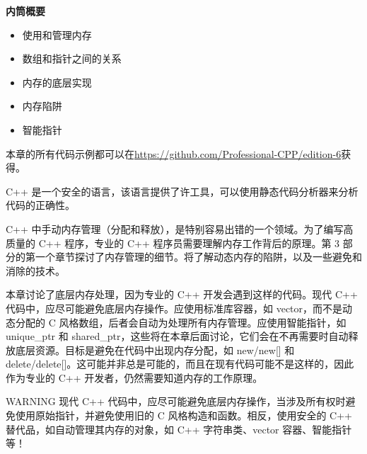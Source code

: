 \noindent
\textbf{内筒概要}

\begin{itemize}
\item
使用和管理内存

\item
数组和指针之间的关系

\item
内存的底层实现

\item
内存陷阱

\item
智能指针
\end{itemize}

本章的所有代码示例都可以在\url{https://github.com/Professional-CPP/edition-6}获得。

C++ 是一个安全的语言，该语言提供了许工具，可以使用静态代码分析器来分析代码的正确性。

C++ 中手动内存管理（分配和释放），是特别容易出错的一个领域。为了编写高质量的 C++ 程序，专业的 C++ 程序员需要理解内存工作背后的原理。第 3 部分的第一个章节探讨了内存管理的细节。将了解动态内存的陷阱，以及一些避免和消除的技术。

本章讨论了底层内存处理，因为专业的 C++ 开发会遇到这样的代码。现代 C++ 代码中，应尽可能避免底层内存操作。应使用标准库容器，如 vector，而不是动态分配的 C 风格数组，后者会自动为处理所有内存管理。应使用智能指针，如 unique\_ptr 和 shared\_ptr，这些将在本章后面讨论，它们会在不再需要时自动释放底层资源。目标是避免在代码中出现内存分配，如 new/new[] 和 delete/delete[]。这可能并非总是可能的，而且在现有代码可能不是这样的，因此作为专业的 C++ 开发者，仍然需要知道内存的工作原理。

\begin{myWarning}{WARNING}
现代 C++ 代码中，应尽可能避免底层内存操作，当涉及所有权时避免使用原始指针，并避免使用旧的 C 风格构造和函数。相反，使用安全的 C++ 替代品，如自动管理其内存的对象，如 C++ 字符串类、vector 容器、智能指针等！
\end{myWarning}




